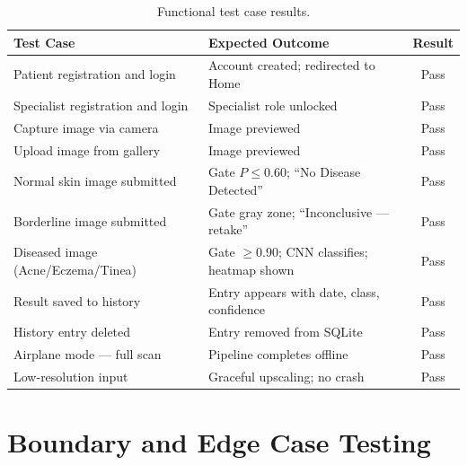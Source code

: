 \begin{table}[H]
\centering
\caption{Functional test case results.}
\label{tab:functional_tests}
\begin{tabular}{|p{5.5cm}|p{4cm}|c|}
\hline
\textbf{Test Case} & \textbf{Expected Outcome} & \textbf{Result} \\ \hline
Patient registration and login & Account created; redirected to Home & Pass \\ \hline
Specialist registration and login & Specialist role unlocked & Pass \\ \hline
Capture image via camera & Image previewed & Pass \\ \hline
Upload image from gallery & Image previewed & Pass \\ \hline
Normal skin image submitted & Gate $P\le0.60$; ``No Disease Detected'' & Pass \\ \hline
Borderline image submitted & Gate gray zone; ``Inconclusive — retake'' & Pass \\ \hline
Diseased image (Acne/Eczema/Tinea) & Gate $\ge0.90$; CNN classifies; heatmap shown & Pass \\ \hline
Result saved to history & Entry appears with date, class, confidence & Pass \\ \hline
History entry deleted & Entry removed from SQLite & Pass \\ \hline
Airplane mode — full scan & Pipeline completes offline & Pass \\ \hline
Low-resolution input & Graceful upscaling; no crash & Pass \\ \hline
\end{tabular}
\end{table}

\section{Boundary and Edge Case Testing}

